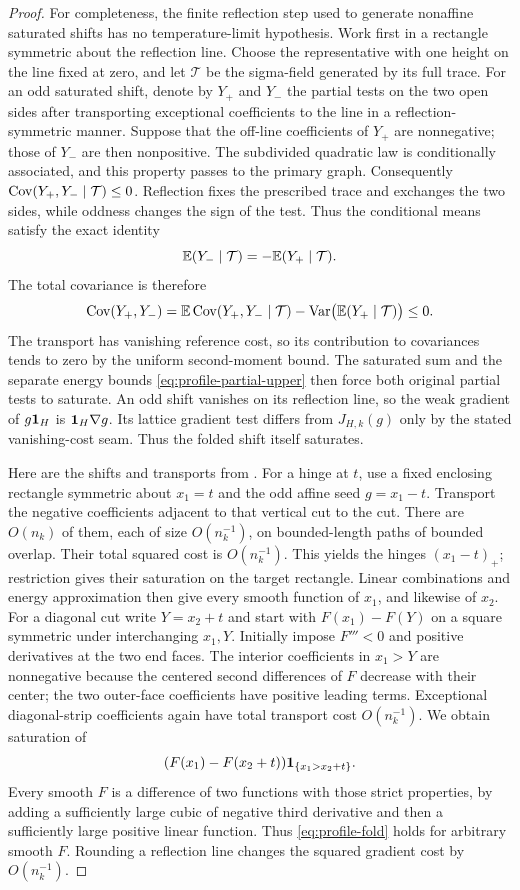 \begin{proof}
For completeness, the finite reflection step used to generate
nonaffine saturated shifts has no temperature-limit hypothesis.
Work first in a rectangle symmetric about the reflection line.
Choose the representative with one height on the line fixed at zero,
and let $\mathcal T$ be the sigma-field generated by its full trace.
For an odd saturated shift, denote by $Y_+$ and $Y_-$ the partial
tests on the two open sides after transporting exceptional
coefficients to the line in a reflection-symmetric manner.
Suppose that the off-line coefficients of $Y_+$ are nonnegative;
those of $Y_-$ are then nonpositive. The subdivided quadratic law is
conditionally associated, and this property passes to the primary
graph. Consequently
$\operatorname{Cov}(Y_+,Y_-\mid\mathcal T)\le0$.
Reflection fixes the prescribed trace and exchanges the two sides,
while oddness changes the sign of the test. Thus the conditional
means satisfy the exact identity
\[
 \mathbb E(Y_-\mid\mathcal T)=-\mathbb E(Y_+\mid\mathcal T).
\]
The total covariance is therefore
\[
 \operatorname{Cov}(Y_+,Y_-)
   =\mathbb E\operatorname{Cov}(Y_+,Y_-\mid\mathcal T)
       -\operatorname{Var}\bigl(\mathbb E(Y_+\mid\mathcal T)\bigr)\le0.
\]
The transport has vanishing reference cost, so its contribution to
covariances tends to zero by the uniform second-moment bound.
The saturated sum and the separate energy bounds
\eqref{eq:profile-partial-upper} then force both original partial
tests to saturate. An odd shift vanishes on its reflection
line, so the weak gradient of $g\mathbf 1_H$ is
$\mathbf 1_H\nabla g$. Its lattice gradient test differs from
$J_{H,k}(g)$ only by the stated vanishing-cost seam. Thus the folded
shift itself saturates.

Here are the shifts and transports from
\cite[proof of Theorem~2.4, Equation~(2.8)]{X}. For a hinge at $t$,
use a fixed enclosing rectangle symmetric about $x_1=t$ and the odd
affine seed $g=x_1-t$. Transport the negative coefficients adjacent to
that vertical cut to the cut. There are $O(n_k)$ of them,
each of size $O(n_k^{-1})$, on bounded-length paths of bounded overlap.
Their total squared cost is $O(n_k^{-1})$. This yields the hinges
$(x_1-t)_+$; restriction gives their saturation on the target
rectangle. Linear combinations and energy approximation then give
every smooth function of $x_1$, and likewise of $x_2$. For a diagonal cut write $Y=x_2+t$ and start with
$F(x_1)-F(Y)$ on a square symmetric under interchanging $x_1,Y$.
Initially impose $F'''<0$ and positive derivatives at the two end
faces. The interior coefficients in $x_1>Y$ are nonnegative because
the centered second differences of $F$ decrease with their center;
the two outer-face coefficients have positive leading terms.
Exceptional diagonal-strip coefficients again have total transport
cost $O(n_k^{-1})$. We obtain saturation of
\begin{equation}\label{eq:profile-fold}
             (F(x_1)-F(x_2+t))\mathbf 1_{\{x_1>x_2+t\}}.
\end{equation}
Every smooth $F$ is a difference of two functions with those strict
properties, by adding a sufficiently large cubic of negative third
derivative and then a sufficiently large positive linear function.
Thus \eqref{eq:profile-fold} holds for arbitrary smooth $F$.
Rounding a reflection line changes the squared gradient cost by
$O(n_k^{-1})$.


\end{proof}
